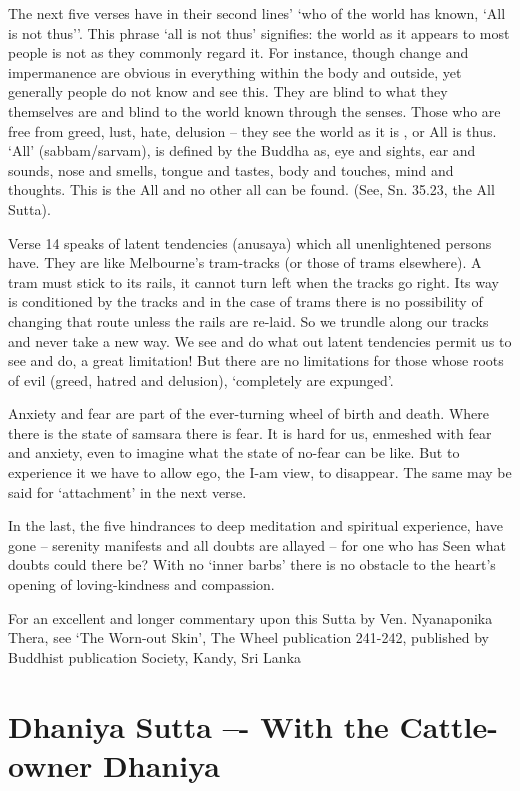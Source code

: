 \begin{itemize}
The next five verses have in their second lines' `who of the world has known, `All is not thus''. This phrase `all is not thus' signifies: the world as it appears to most people is not as they commonly regard it. For instance, though change and impermanence are obvious in everything within the body and outside, yet generally people do not know and see this. They are blind to what they themselves are and blind to the world known through the senses. Those who are free from greed, lust, hate, delusion – they see the world as it is , or All is thus. `All' (sabbam/sarvam), is defined by the Buddha as, eye and sights, ear and sounds, nose and smells, tongue and tastes, body and touches, mind and thoughts. This is the All and no other all can be found. (See, Sn. 35.23, the All Sutta).
   
Verse 14 speaks of latent tendencies (anusaya) which all unenlightened persons have. They are like Melbourne's tram-tracks (or those of trams elsewhere). A tram must stick to its rails, it cannot turn left when the tracks go right. Its way is conditioned by the tracks and in the case of trams there is no possibility of changing that route unless the rails are re-laid. So we trundle along our tracks and never take a new way. We see and do what out latent tendencies permit us to see and do, a great limitation! But there are no limitations for those whose roots of evil (greed, hatred and delusion), `completely are expunged'.
   
Anxiety and fear are part of the ever-turning wheel of birth and death. Where there is the state of samsara there is fear. It is hard for us, enmeshed with fear and anxiety, even to imagine what the state of no-fear can be like. But to experience it we have to allow ego, the I-am view, to disappear. The same may be said for `attachment' in the next verse.
   
In the last, the five hindrances to deep meditation and spiritual experience, have gone – serenity manifests and all doubts are allayed – for one who has Seen what doubts could there be? With no `inner barbs' there is no obstacle to the heart's opening of loving-kindness and compassion.
   
For an excellent and longer commentary upon this Sutta by Ven. Nyanaponika Thera, see `The Worn-out Skin', The Wheel publication 241-242, published by Buddhist publication Society, Kandy, Sri Lanka 
\end{itemize}
   
   \chapter{Dhaniya Sutta –- With the Cattle-owner Dhaniya}
   
